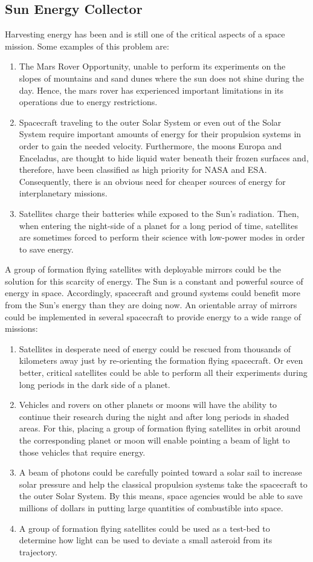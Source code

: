 \subsection{Sun Energy Collector}
\label{energy_collector}
Harvesting energy has been and is still one of the critical aspects
of a space mission. Some examples of this problem are: 
\begin{enumerate}
\item The Mars Rover Opportunity, unable to perform its experiments on the
slopes of mountains and sand dunes where the sun does not shine during
the day. Hence, the mars rover has experienced important limitations
in its operations due to energy restrictions.
\item Spacecraft traveling to the outer Solar System or even out of the
Solar System require important amounts of energy for their propulsion
systems in order to gain the needed velocity. Furthermore, the moons Europa and Enceladus, are thought
to hide liquid water beneath their frozen surfaces and, therefore, have
been classified as high priority for NASA and ESA. Consequently, there
is an obvious need for cheaper sources of energy for interplanetary
missions.
\item Satellites charge their batteries while exposed to the Sun's radiation.
Then, when entering the night-side of a planet for a long period
of time, satellites are sometimes forced to perform their science with low-power
modes in order to save energy.
\end{enumerate}
A group of formation flying satellites with deployable mirrors could
be the solution for this scarcity of energy. The Sun is a constant
and powerful source of energy in space. Accordingly, spacecraft and
ground systems could benefit more from the Sun's energy than they
are doing now. An orientable array of mirrors could be implemented
in several spacecraft to provide energy to a wide range of missions:
\begin{enumerate}
\item Satellites in desperate need of energy could be rescued from thousands
of kilometers away just by re-orienting the formation flying spacecraft.
Or even better, critical satellites could be able to perform all their
experiments during long periods in the dark side of a planet. 
\item Vehicles and rovers on other planets or moons will have the ability
to continue their research during the night and after long periods
in shaded areas. For this, placing a group of formation flying satellites
in orbit around the corresponding planet or moon will enable pointing
a beam of light to those vehicles that require energy.
\item A beam of photons could be carefully pointed toward a solar sail to
increase solar pressure and help the classical propulsion systems
take the spacecraft to the outer Solar System. By this means, space
agencies would be able to save millions of dollars in putting large
quantities of combustible into space.
\item A group of formation flying satellites could be used as a test-bed
to determine how light can be used to deviate a small asteroid from
its trajectory.
\end{enumerate}


